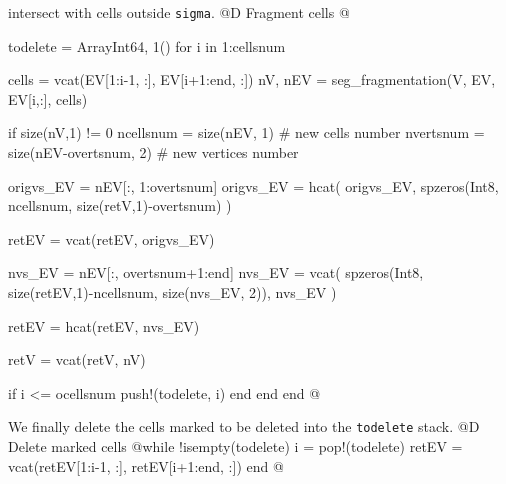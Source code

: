 \documentclass[10pt,oneside]{article}
\begin{document}
intersect with cells outside \texttt{sigma}.
@D Fragment cells
@{todelete = Array{Int64, 1}()
for i in 1:cellsnum

    cells = vcat(EV[1:i-1, :], EV[i+1:end, :])
    nV, nEV = seg_fragmentation(V, EV, EV[i,:], cells)

    if size(nV,1) != 0
        ncellsnum = size(nEV, 1) # new cells number
        nvertsnum = size(nEV-overtsnum, 2) # new vertices number

        origvs_EV = nEV[:, 1:overtsnum]
        origvs_EV = hcat(
            origvs_EV,
            spzeros(Int8, ncellsnum, size(retV,1)-overtsnum)
        )
        
        retEV = vcat(retEV, origvs_EV)

        nvs_EV = nEV[:, overtsnum+1:end]
        nvs_EV = vcat(
            spzeros(Int8, size(retEV,1)-ncellsnum, size(nvs_EV, 2)),
            nvs_EV
        )

        retEV = hcat(retEV, nvs_EV)
        
        retV = vcat(retV, nV)

        if i <= ocellsnum
            push!(todelete, i)
        end
    end
end
@}
We finally delete the cells marked to be deleted into the \texttt{todelete} stack.
@D Delete marked cells
@{while !isempty(todelete) 
    i = pop!(todelete)
    retEV = vcat(retEV[1:i-1, :], retEV[i+1:end, :])
end
@}


\end{document}
